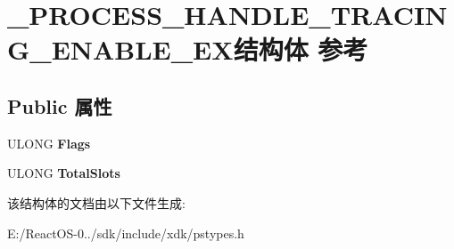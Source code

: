 \hypertarget{struct___p_r_o_c_e_s_s___h_a_n_d_l_e___t_r_a_c_i_n_g___e_n_a_b_l_e___e_x}{}\section{\+\_\+\+P\+R\+O\+C\+E\+S\+S\+\_\+\+H\+A\+N\+D\+L\+E\+\_\+\+T\+R\+A\+C\+I\+N\+G\+\_\+\+E\+N\+A\+B\+L\+E\+\_\+\+E\+X结构体 参考}
\label{struct___p_r_o_c_e_s_s___h_a_n_d_l_e___t_r_a_c_i_n_g___e_n_a_b_l_e___e_x}
\subsection*{Public 属性}
\begin{DoxyCompactItemize}
\item 
\mbox{\label{struct___p_r_o_c_e_s_s___h_a_n_d_l_e___t_r_a_c_i_n_g___e_n_a_b_l_e___e_x_a634ad6a0407897950a308fee70d11b7a}} 
U\+L\+O\+NG {\bfseries Flags}
\item 
\mbox{\label{struct___p_r_o_c_e_s_s___h_a_n_d_l_e___t_r_a_c_i_n_g___e_n_a_b_l_e___e_x_af4c2bdbc85f1751420f989ece2c70bd8}} 
U\+L\+O\+NG {\bfseries Total\+Slots}
\end{DoxyCompactItemize}


该结构体的文档由以下文件生成\+:\begin{DoxyCompactItemize}
\item 
E\+:/\+React\+O\+S-\/0../sdk/include/xdk/pstypes.\+h\end{DoxyCompactItemize}
